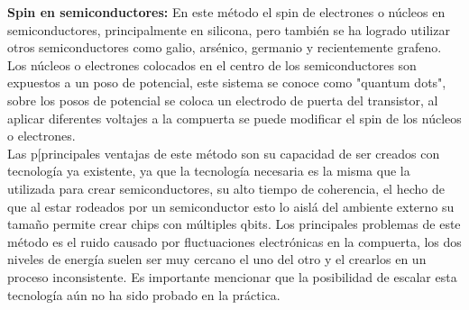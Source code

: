 \textbf{Spin en semiconductores:} En este método el spin de electrones o núcleos en semiconductores, principalmente en silicona, pero también se ha logrado utilizar otros semiconductores como galio, arsénico, germanio y recientemente grafeno. Los núcleos o electrones colocados en el centro de los semiconductores son expuestos a un poso de potencial, este sistema se conoce como "quantum dots", sobre los posos de potencial se coloca un electrodo de puerta del transistor, al aplicar diferentes voltajes a la compuerta se puede modificar el spin de los núcleos o electrones.\\
Las p[principales ventajas de este método son su capacidad de ser creados con tecnología ya existente, ya que la tecnología necesaria es la misma que la utilizada para crear semiconductores, su alto tiempo de coherencia, el hecho de que al estar rodeados por un semiconductor esto lo aislá del ambiente externo su tamaño permite crear chips con múltiples qbits. Los principales problemas de este método es el ruido causado por fluctuaciones electrónicas en la compuerta, los dos niveles de energía suelen ser muy cercano el uno del otro y el crearlos en un proceso inconsistente. Es importante mencionar que la posibilidad de escalar esta tecnología aún no ha sido probado en la práctica.
